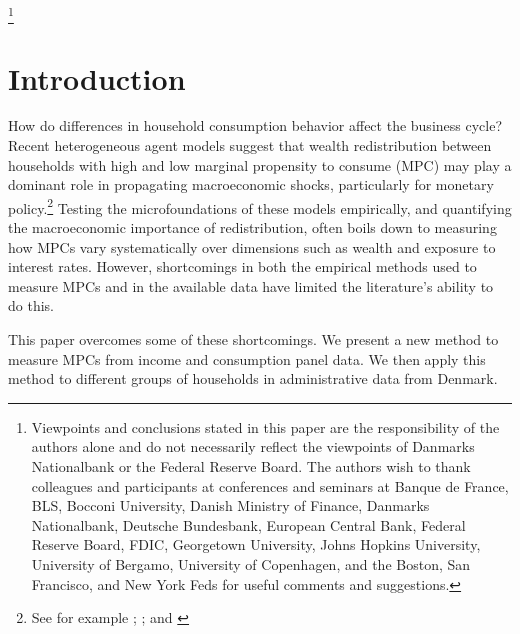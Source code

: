 \documentclass[titlepage]{\econtex}\newcommand{\texname}{ConsumptionHeterogeneity}
\begin{document}
\begin{authorsinfo}
\end{authorsinfo}
\thanks{Viewpoints and conclusions stated in this paper are the responsibility of the authors alone and do not necessarily reflect the viewpoints of Danmarks Nationalbank or the Federal Reserve Board. The authors wish to thank colleagues and participants at conferences and seminars at Banque de France, BLS, Bocconi University, Danish Ministry of Finance, Danmarks Nationalbank, Deutsche Bundesbank, European Central Bank, Federal Reserve Board, FDIC, Georgetown University, Johns Hopkins University, University of Bergamo, University of Copenhagen, and the Boston, San Francisco, and New York Feds for useful comments and suggestions.}

\titlepagefinish
\setcounter{page}{1}

\pagebreak
\section{Introduction}
How do differences in household consumption behavior affect the business cycle? Recent heterogeneous agent models suggest that wealth redistribution between households with high and low marginal propensity to consume (MPC) may play a dominant role in propagating macroeconomic shocks, particularly for monetary policy.\footnote{See for example \cite{kaplan_monetary_2016}; \cite{garriga_mortgages_2017}; and \cite{greenwald_mortgage_2018}} Testing the microfoundations of these models empirically, and quantifying the macroeconomic importance of redistribution, often boils down to measuring how MPCs vary systematically over dimensions such as wealth and exposure to interest rates. However, shortcomings in both the empirical methods used to measure MPCs and in the available data have limited the literature's ability to do this.

This paper overcomes some of these shortcomings. We present a new method to measure MPCs from income and consumption panel data. We then apply this method to different groups of households in administrative data from Denmark.
\end{document}
